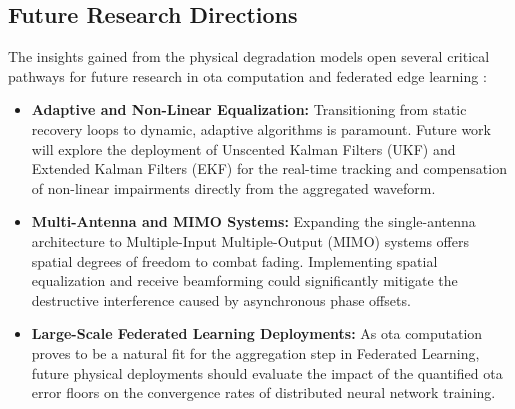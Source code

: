\documentclass[Markos_Delaportas_1316.tex]{subfiles}
\begin{document}
\subsection{Future Research Directions}
The insights gained from the physical degradation models open several
critical pathways for
future research in \gls{ota} computation and federated edge learning
\cite{xiao_heterogeneous_2025, zhu_over--air_2024}:
\begin{itemize}
    \item \textbf{Adaptive and Non-Linear Equalization:}
        Transitioning from static recovery loops to dynamic, adaptive
        algorithms is paramount. Future work will explore the
        deployment of Unscented Kalman Filters (UKF) and Extended
        Kalman Filters (EKF) for the real-time tracking and
        compensation of non-linear impairments directly from the
        aggregated waveform.
    \item \textbf{Multi-Antenna and MIMO Systems:} Expanding the
        single-antenna architecture to Multiple-Input Multiple-Output
        (MIMO) systems offers spatial degrees of freedom to combat
        fading. Implementing spatial equalization and receive
        beamforming \cite{sahin_survey_2023} could significantly
        mitigate the destructive interference caused by asynchronous
        phase offsets.
    \item \textbf{Large-Scale Federated Learning Deployments:} As
        \gls{ota} computation proves to be a natural fit for the
        aggregation step in Federated Learning, future physical
        deployments should evaluate the impact of the quantified
        \gls{ota} error floors on the convergence rates of
        distributed neural network training.
\end{itemize}

\ifSubfilesClassLoaded{
    \clearpage
    \printbibliography
}{}
\end{document}
